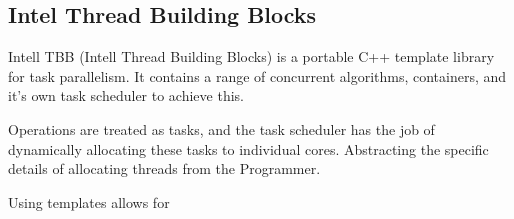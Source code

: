 \subsection{Intel Thread Building Blocks}

Intell TBB (Intell Thread Building Blocks) is a portable C++ template library for task parallelism.
It contains a range of concurrent algorithms, containers, and it's own task scheduler to achieve this.

Operations are treated as tasks, and the task scheduler has the job of dynamically allocating these tasks 
to individual cores. Abstracting the specific details of allocating threads from the Programmer. 

Using templates allows for 

